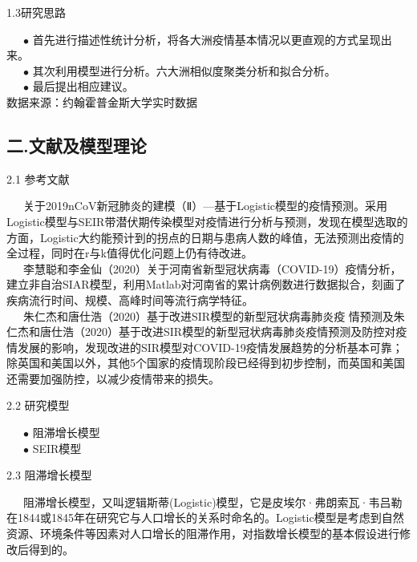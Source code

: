 \documentclass[
  ignorenonframetext,
]{beamer}
\begin{document}
\begin{frame}{1.3研究思路}
\protect\hypertarget{section-4}{}

  \(\bullet\)
首先进行描述性统计分析，将各大洲疫情基本情况以更直观的方式呈现出来。\\
  \(\bullet\) 其次利用模型进行分析。六大洲相似度聚类分析和拟合分析。\\
  \(\bullet\) 最后提出相应建议。\\
数据来源：约翰霍普金斯大学实时数据

\end{frame}

\hypertarget{section-5}{%
\subsection{二.文献及模型理论}\label{section-5}}

\begin{frame}{2.1 参考文献}
\protect\hypertarget{section-6}{}

  关于2019nCoV新冠肺炎的建模（Ⅱ）---基于Logistic模型的疫情预测。采用Logistic模型与SEIR带潜伏期传染模型对疫情进行分析与预测，发现在模型选取的方面，Logistic大约能预计到的拐点的日期与患病人数的峰值，无法预测出疫情的全过程，同时在r与k值得优化问题上仍有待改进。\\
  李慧聪和李金仙（2020）关于河南省新型冠状病毒（COVID-19）疫情分析，建立非自治SIAR模型，利用Matlab对河南省的累计病例数进行数据拟合，刻画了疾病流行时间、规模、高峰时间等流行病学特征。\\
  朱仁杰和唐仕浩（2020）基于改进SIR模型的新型冠状病毒肺炎疫
情预测及朱仁杰和唐仕浩（2020）基于改进SIR模型的新型冠状病毒肺炎疫情预测及防控对疫情发展的影响，发现改进的SIR模型对COVID-19疫情发展趋势的分析基本可靠；除英国和美国以外，其他5个国家的疫情现阶段已经得到初步控制，而英国和美国还需要加强防控，以减少疫情带来的损失。

\end{frame}

\begin{frame}{2.2 研究模型}
\protect\hypertarget{section-7}{}

  \(\bullet\) 阻滞增长模型\\
  \(\bullet\) SEIR模型

\end{frame}

\begin{frame}{2.3 阻滞增长模型}
\protect\hypertarget{section-8}{}

  阻滞增长模型，又叫逻辑斯蒂(Logistic)模型，它是皮埃尔·弗朗索瓦·韦吕勒在1844或1845年在研究它与人口增长的关系时命名的。Logistic模型是考虑到自然资源、环境条件等因素对人口增长的阻滞作用，对指数增长模型的基本假设进行修改后得到的。

\end{frame}
\end{document}
